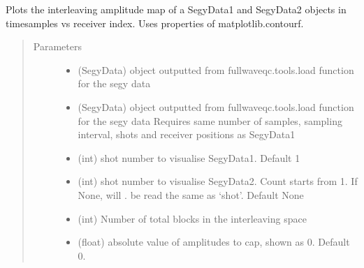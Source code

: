\documentclass[letterpaper,10pt,english]{sphinxmanual}
\begin{document}

\begin{fulllineitems}
\label{\detokenize{index:fullwaveqc.visual.interamp}}
Plots the interleaving amplitude map of a SegyData1 and SegyData2 objects in timesamples vs receiver index.
Uses properties of matplotlib.contourf.
\begin{quote}\begin{description}
\item[{Parameters}] \leavevmode\begin{itemize}
\item {} 
 \textendash{} (SegyData)   object outputted from fullwaveqc.tools.load function for the segy data

\item {} 
 \textendash{} (SegyData)   object outputted from fullwaveqc.tools.load function for the segy data
Requires same number of samples, sampling interval, shots and receiver
positions as SegyData1

\item {} 
 \textendash{} (int)        shot number to visualise SegyData1. Default 1

\item {} 
 \textendash{} (int)        shot number to visualise SegyData2. Count starts from 1. If None, will .
be read the same as ‘shot’. Default None

\item {} 
 \textendash{} (int)        Number of total blocks in the interleaving space

\item {} 
 \textendash{} (float)      absolute value of amplitudes to cap, shown as 0. Default 0.


\end{itemize}
\end{description}
\end{quote}
\end{fulllineitems}
\end{document}
